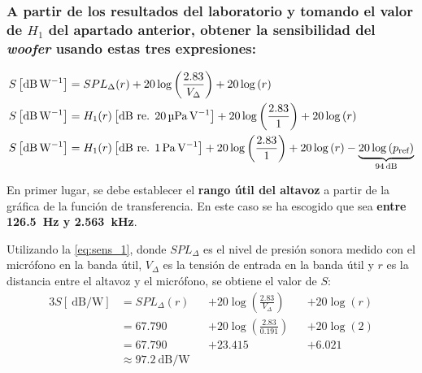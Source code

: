 \documentclass[10pt]{article}
\begin{document}
\subsubsection{\texorpdfstring{A partir de los resultados del laboratorio y tomando el valor de $H_1$ del apartado anterior, obtener la sensibilidad del \textit{woofer} usando estas tres expresiones:}{Pregunta 2}}
\begin{align} \label{eq:sens_1}
  S \left[ \SI{}{\dB\per\watt} \right] & = SPL_{\Delta} (r) + 20 \log \left( \frac{2.83}{V_{\Delta}} \right) + 20 \log \left( r \right)                                                                                                                       \\ \label{eq:sens_2}
  S \left[ \SI{}{\dB\per\watt} \right] & = H_1(r) \left[ \SI{}{\dB}\text{ re. }\SI{20}{\micro\pascal\per\volt} \right] + 20 \log \left( \frac{2.83}{1} \right) + 20 \log \left( r \right)                                                                     \\ \label{eq:sens_3}
  S \left[ \SI{}{\dB\per\watt} \right] & = H_1(r) \left[ \SI{}{\dB}\text{ re. }\SI{1}{\pascal\per\volt} \right] + 20 \log \left( \frac{2.83}{1} \right) + 20 \log \left( r \right) - \underbrace{20 \log \left( p _{\textnormal{ref}} \right)}_{\SI{94}{\dB}}
\end{align}

En primer lugar, se debe establecer el \textbf{rango útil del altavoz} a partir de la gráfica de la función de transferencia. En este caso se ha escogido que sea \textbf{entre \qty{126.5}{\hertz} y \SI{2.563}{\kilo\Hz}}.

Utilizando la \autoref{eq:sens_1}, donde $SPL_{\Delta }$ es el nivel de presión sonora medido con el micrófono en la banda útil, $V_{\Delta }$ es la tensión de entrada en la banda útil y $r$ es la distancia entre el altavoz y el micrófono, se obtiene el valor de $S$:
\begin{alignat*}{3}
  S \left[ \SI{}{\dB\per\watt} \right] & = SPL_{\Delta} (r)                       &  & + 20 \log \left( \frac{2.83}{V_{\Delta}} \right) &  & + 20 \log \left( r \right) \\
                                       & = \num{67.790}                           &  & + 20 \log \left( \frac{2.83}{0.191} \right)      &  & + 20 \log \left( 2 \right) \\
                                       & = \num{67.790}                           &  & + \num{23.415}                                   &  & + 6.021                    \\
                                       & \approx \boxed{\qty{97.2}{\dB\per\watt}} &  &                                                  &  &
\end{alignat*}
\end{document}
